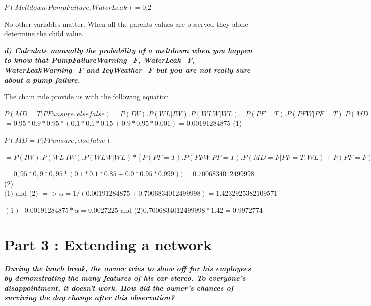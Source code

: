 $P(Meltdown | PumpFailure,WaterLeak ) = 0.2$

No other variables matter.
When all the parents values are observed they alone determine the child value.


\textit{\textbf{d) Calculate manually the probability of a meltdown when you
happen to know that PumpFailureWarning=F, WaterLeak=F, WaterLeakWarning=F and
 IcyWeather=F but you are not really sure about a pump failure.}}

 \vspace{1em}

\begin{center}
The chain rule provide us with the following equation

$P(MD=T|PF unsure,else false)=
P(IW).P(WL|IW).P(WLW|WL).[P(PF=T).P(PFW|PF=T).P(MD=T|PF=T,WL)+
P(PF=F).P(PFW|PF=F).P(MD=T|PF=F,WL)]$
$= 0.95*0.9*0.95*(0.1*0.1*0.15+0.9*0.95*0.001) = 0.00191284875$ (1)
\end{center}

\vspace{2em}
\begin{center}
$P(MD=F|PF unsure, else false)$

$=P(IW).P(WL|IW).P(WLW|WL)* [P(PF=T).P(PFW|PF=T).P(MD=F|PF=T,WL) +
P(PF=F).P(PFW|PF=F).P(MD=F|PF=F,WL)]$

$= 0,95 * 0,9 * 0,95 * (0.1*0.1*0.85+0.9*0.95*0.999)) =0.7006834012499998$ (2)
\vspace{2em}
$\text{(1) and (2) }=> \alpha = 1 / (0.00191284875 + 0.7006834012499998) =
1.4232925382109571 $

$(1)\text{ } 0.00191284875 * \alpha = 0.0027225\text{ and (2)
}0.7006834012499998 * 1.42 = 0.9972774 $

\end{center}




\newpage
\thispagestyle{empty}
\section*{Part 3 : Extending a network}

\textit{\textbf{During the lunch break, the owner tries to show off for his
employees by demonstrating the many features of his car stereo.
To everyone's disappointment, it doesn't work. How did the owner's
chances of surviving the day change after this observation?}}

